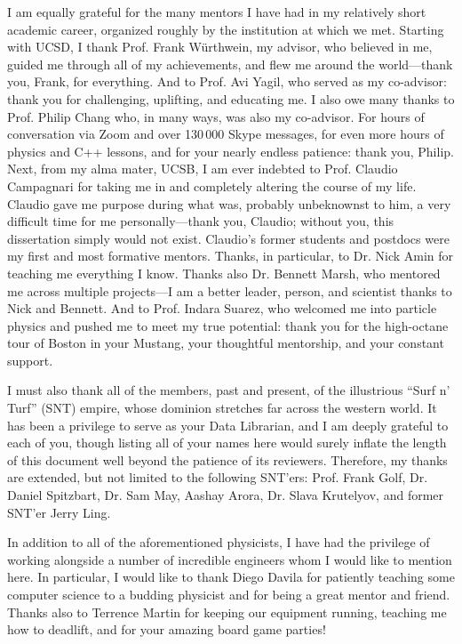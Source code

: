 \begin{acknowledgements}
I am equally grateful for the many mentors I have had in my relatively short academic career, organized roughly by the institution at which we met. 
Starting with UCSD, I thank Prof. Frank W\"urthwein, my advisor, who believed in me, guided me through all of my achievements, and flew me around the world---thank you, Frank, for everything. 
And to Prof. Avi Yagil, who served as my co-advisor: thank you for challenging, uplifting, and educating me. 
I also owe many thanks to Prof. Philip Chang who, in many ways, was also my co-advisor. 
For hours of conversation via Zoom and over 130\,000 Skype messages, for even more hours of physics and C++ lessons, and for your nearly endless patience: thank you, Philip. 
Next, from my alma mater, UCSB, I am ever indebted to Prof. Claudio Campagnari for taking me in and completely altering the course of my life. 
Claudio gave me purpose during what was, probably unbeknownst to him, a very difficult time for me personally---thank you, Claudio; without you, this dissertation simply would not exist. 
Claudio's former students and postdocs were my first and most formative mentors. 
Thanks, in particular, to Dr. Nick Amin for teaching me everything I know. 
Thanks also Dr. Bennett Marsh, who mentored me across multiple projects---I am a better leader, person, and scientist thanks to Nick and Bennett. 
And to Prof. Indara Suarez, who welcomed me into particle physics and pushed me to meet my true potential: thank you for the high-octane tour of Boston in your Mustang, your thoughtful mentorship, and your constant support. 

I must also thank all of the members, past and present, of the illustrious ``Surf n' Turf'' (SNT) empire, whose dominion stretches far across the western world. 
It has been a privilege to serve as your Data Librarian, and I am deeply grateful to each of you, though listing all of your names here would surely inflate the length of this document well beyond the patience of its reviewers. 
Therefore, my thanks are extended, but not limited to the following SNT'ers: Prof. Frank Golf, Dr. Daniel Spitzbart, Dr. Sam May, Aashay Arora, Dr. Slava Krutelyov, and former SNT'er Jerry Ling.

In addition to all of the aforementioned physicists, I have had the privilege of working alongside a number of incredible engineers whom I would like to mention here. 
In particular, I would like to thank Diego Davila for patiently teaching some computer science to a budding physicist and for being a great mentor and friend. 
Thanks also to Terrence Martin for keeping our equipment running, teaching me how to deadlift, and for your amazing board game parties! 


\end{acknowledgements}
